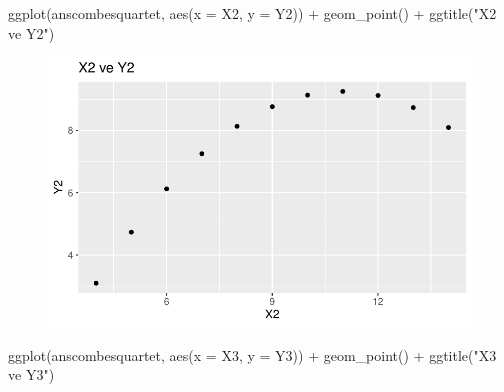 \documentclass[
  letterpaper,
  DIV=11,
  numbers=noendperiod]{scrartcl}
\newenvironment{Shaded}{\begin{snugshade}}{\end{snugshade}}
\newcommand{\AttributeTok}[1]{\textcolor[rgb]{0.40,0.45,0.13}{#1}}
\newcommand{\FunctionTok}[1]{\textcolor[rgb]{0.28,0.35,0.67}{#1}}
\newcommand{\NormalTok}[1]{\textcolor[rgb]{0.00,0.23,0.31}{#1}}
\newcommand{\SpecialCharTok}[1]{\textcolor[rgb]{0.37,0.37,0.37}{#1}}
\newcommand{\StringTok}[1]{\textcolor[rgb]{0.13,0.47,0.30}{#1}}
\begin{document}
\begin{Shaded}
\begin{Highlighting}[]
\FunctionTok{ggplot}\NormalTok{(anscombesquartet, }\FunctionTok{aes}\NormalTok{(}\AttributeTok{x =}\NormalTok{ X2, }\AttributeTok{y =}\NormalTok{ Y2)) }\SpecialCharTok{+} 
  \FunctionTok{geom\_point}\NormalTok{() }\SpecialCharTok{+} 
  \FunctionTok{ggtitle}\NormalTok{(}\StringTok{"X2 ve Y2"}\NormalTok{)}
\end{Highlighting}
\end{Shaded}

\begin{figure}[H]

{\centering \includegraphics{4_hafta_tanimlayici_istatistik_files/figure-pdf/unnamed-chunk-26-2.pdf}

}

\end{figure}

\begin{Shaded}
\begin{Highlighting}[]
\FunctionTok{ggplot}\NormalTok{(anscombesquartet, }\FunctionTok{aes}\NormalTok{(}\AttributeTok{x =}\NormalTok{ X3, }\AttributeTok{y =}\NormalTok{ Y3)) }\SpecialCharTok{+} 
  \FunctionTok{geom\_point}\NormalTok{() }\SpecialCharTok{+} 
  \FunctionTok{ggtitle}\NormalTok{(}\StringTok{"X3 ve Y3"}\NormalTok{)}
\end{Highlighting}
\end{Shaded}
\end{document}
